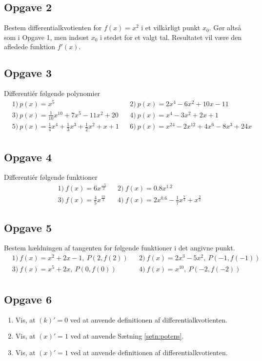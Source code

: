 \subsection*{Opgave 2}
Bestem differentialkvotienten for $f(x) = x^2$ i et vilkårligt punkt $x_0$. Gør altså som i Opgave 1, men indsæt $x_0$ i stedet for et valgt tal. Resultatet vil være den afledede funktion $f'(x)$.

\subsection*{Opgave 3}
Differentiér følgende polynomier
\begin{align*}
	&1) \ p(x) = x^5   &&2) \ p(x) = 2x^4-6x^2+10x-11     \\
	&3) \ p(x) = \frac{1}{10}x^{10}+7x^5-11x^2+20  &&4) \ p(x) = x^4-3x^2+2x+1     \\ 
	&5) \ p(x) = \frac{1}{4}x^4 + \frac{1}{3}x^3+\frac{1}{2}x^2+x + 1
	  &&6) \  p(x) = x^{24}-2x^{12}+4x^{6}-8x^{3}+24x   \\ 
\end{align*}

\subsection*{Opgave 4}
Differentiér følgende funktioner
\begin{align*}
	&1) \ f(x) = 6x^{\frac{-5}{2}}  &&2) \  f(x) = 0.8x^{1.2}  \\
	&3) \ f(x) = \frac{4}{5}x^{\frac{10}{3}} &&4) \ f(x) =2x^{0.6}-\frac{1}{7}x^{\frac{7}{3}} + x^{\frac{3}{2}} 
\end{align*} 

\subsection*{Opgave 5}
Bestem hældningen af tangenten for følgende funktioner i det angivne punkt.
\begin{align*}
	&1) \ f(x) = x^2 + 2x -1, \ P(2,f(2)) &&2) \ f(x) = 2x^3-5x^2, \ P(-1,f(-1))\\
	&3) \ f(x) = x^{5}+2x, \ P(0,f(0)) &&4) \ f(x) =x^10 , \ P(-2,f(-2))\\
\end{align*}

\subsection*{Opgave 6}
\begin{enumerate}[label=\roman*)]
	\item Vis, at $(k)' = 0$ ved at anvende definitionen af differentialkvotienten.
	\item Vis, at $(x)' = 1$ ved at anvende Sætning \ref{setn:potens}.
	\item Vis, at $(x)' = 1$ ved at anvende definitionen af differentialkvotienten. 
\end{enumerate}
